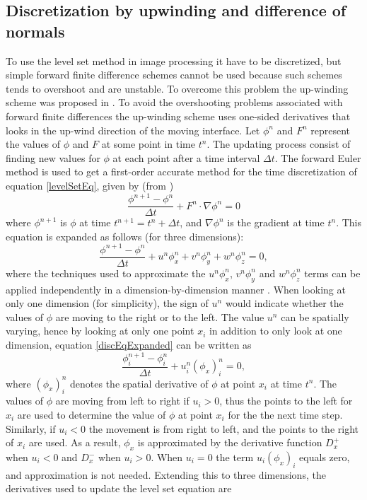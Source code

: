 \subsection{Discretization by upwinding and difference of normals}
\label{upwinding}
To use the level set method in image processing it have to be discretized, but simple forward finite difference schemes cannot be used because such schemes tends to overshoot and are unstable. To overcome this problem the up-winding scheme was proposed in \cite{osher88}. To avoid the overshooting problems associated with forward finite differences the up-winding scheme uses one-sided derivatives that looks in the up-wind direction of the moving interface. Let \(\phi^n\) and \(F^n\) represent the values of \(\phi\) and \(F\) at some point in time \(t^n\). The updating process consist of finding new values for \(\phi\) at each point after a time interval \(\Delta t\). The forward Euler method is used to get a first-order accurate method for the time discretization of equation \ref{levelSetEq}, given by (from \cite{osher02})
\begin{equation}
\frac{\phi^{n+1}-\phi^n}{\Delta t} + F^n \cdot \nabla \phi^n = 0
\label{discEq}
\end{equation}
where \(\phi^{n+1}\) is \(\phi\) at time \(t^{n+1} = t^n + \Delta t\), and \(\nabla \phi^n\) is the gradient at time \(t^n\). This equation is expanded as follows (for three dimensions):
\begin{equation}
\frac{\phi^{n+1}-\phi^n}{\Delta t} + u^n \phi_x^n + v^n \phi_y^n + w^n \phi_z^n= 0,
\label{discEqExpanded}
\end{equation}
where the techniques used to approximate the \(u^n \phi_x^n\), \(v^n \phi_y^n \) and \(w^n \phi_z^n\) terms can be applied independently in a dimension-by-dimension manner \cite{osher02}. When looking at only one dimension (for simplicity), the sign of \(u^n\) would indicate whether the values of \(\phi\) are moving to the right or to the left. The value \(u^n\) can be spatially varying, hence by looking at only one point \(x_i\) in addition to only look at one dimension, equation \ref{discEqExpanded} can be written as
\begin{equation}
\frac{\phi_i^{n+1}-\phi_i^n}{\Delta t} + u_i^n (\phi_x)_i^n = 0,
\label{discEq1DPoint}
\end{equation}  
where \((\phi_x)_i^n\) denotes the spatial derivative of \(\phi\) at point \(x_i\) at time \(t^n\). The values of \(\phi\) are moving from left to right if \(u_i > 0\), thus the points to the left for \(x_i\) are used to determine the value of \(\phi\) at point \(x_i\) for the the next time step. Similarly, if \(u_i < 0\) the movement is from right to left, and the points to the right of \(x_i\) are used. As a result, \(\phi_x\) is approximated by the derivative function \(D_x^+\) when \(u_i < 0\) and \(D_x^-\) when \(u_i > 0\). When \(u_i = 0\) the term \(u_i(\phi_x)_i\) equals zero, and approximation is not needed. Extending this to three dimensions, the derivatives used to update the level set equation are 
